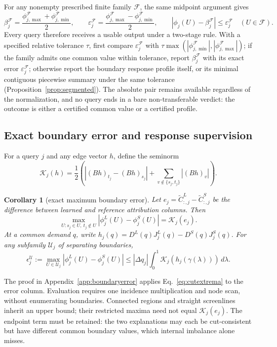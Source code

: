 \documentclass[a4paper,fleqn]{cas-sc}
\newtheorem{corollary}[theorem]{Corollary}
\begin{document}
For any nonempty prescribed finite family $\mathcal F$, the same midpoint argument gives
\begin{equation}
\beta_j^{\mathcal F}=\frac{\phi_{j,\max}^{\mathcal F}+\phi_{j,\min}^{\mathcal F}}2,
\qquad \varepsilon_j^{\mathcal F}=\frac{\phi_{j,\max}^{\mathcal F}-\phi_{j,\min}^{\mathcal F}}2,
\qquad |\phi_j(U)-\beta_j^{\mathcal F}|\le\varepsilon_j^{\mathcal F}\quad(U\in\mathcal F).
\label{eq:familycommon}
\end{equation}
Every query therefore receives a usable output under a two-stage rule.
With a specified relative tolerance $\tau$, first compare
$\varepsilon_j^{\mathcal F}$ with
$\tau\max(|\phi_{j,\min}^{\mathcal F}|,|\phi_{j,\max}^{\mathcal F}|)$;
if the family admits one common value within tolerance, report
$\beta_j^{\mathcal F}$ with its exact error $\varepsilon_j^{\mathcal F}$;
otherwise report the boundary response profile itself, or its minimal
contiguous piecewise summary under the same tolerance
(Proposition~\ref{prop:segmented}). The absolute pair remains available
regardless of the normalization, and no query ends in a bare
non-transferable verdict: the outcome is either a certified common
value or a certified profile.



\subsection{Exact boundary error and response supervision}\label{sec:boundarylearning}
For a query $j$ and any edge vector $h$, define the seminorm
\begin{equation}
\mathcal K_j(h)=\frac12\left(\left|(Bh)_{t_j}-(Bh)_{s_j}\right|
+\sum_{v\notin\{s_j,t_j\}}|(Bh)_v|\right).
\label{eq:boundaryseminorm}
\end{equation}
\begin{corollary}[exact maximum boundary error]\label{cor:boundaryerror}
Let $e_j=\widetilde C^L_{:,j}-\widetilde C^S_{:,j}$ be the difference
between learned and reference attribution columns. Then
\begin{equation}
\max_{U:s_j\in U,\ t_j\notin U}|\phi_j^L(U)-\phi_j^S(U)|
=\mathcal K_j(e_j).\label{eq:exactboundaryerror}
\end{equation}
At a common demand $q$, write
$h_j(q)=D^L(q)J_j^L(q)-D^S(q)J_j^S(q)$.
For any subfamily $\mathcal U_j$ of separating boundaries,
\begin{equation}
\epsilon_j^{\mathcal U}:=\max_{U\in\mathcal U_j}|\phi_j^L(U)-\phi_j^S(U)|
\le |\Delta q_j|\int_0^1\mathcal K_j(h_j(\gamma(\lambda)))\,d\lambda.
\label{eq:localboundarybound}
\end{equation}
\end{corollary}
The proof in Appendix~\ref{app:boundaryerror} applies
Eq.~\eqref{eq:cutextrema} to the error column. Evaluation requires one
incidence multiplication and node scan, without enumerating boundaries.
Connected regions and straight screenlines inherit an upper bound; their
restricted maxima need not equal $\mathcal K_j(e_j)$. The endpoint term
must be retained: the two explanations may each be cut-consistent but
have different common boundary values, which internal imbalance alone misses.
\end{document}
